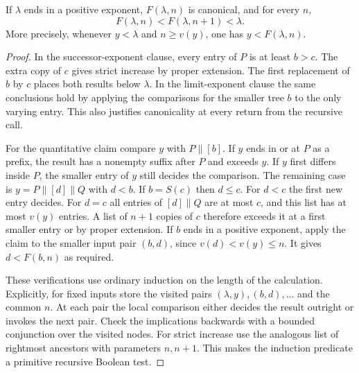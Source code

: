 \begin{theorem}
\label{thm:fsquant}
If $\lambda$ ends in a positive exponent, $F(\lambda,n)$ is canonical,
and for every $n$,
\[
 F(\lambda,n)<F(\lambda,n+1)<\lambda.
\]
More precisely, whenever $y<\lambda$ and $n\ge v(y)$, one has
$y<F(\lambda,n)$.
\end{theorem}
\begin{proof}
In the successor-exponent clause, every entry of $P$ is at least $b>c$.
The extra copy of $c$ gives strict increase by proper extension. The
first replacement of $b$ by $c$ places both results below $\lambda$.
In the limit-exponent clause the same conclusions hold by applying the
comparisons for the smaller tree $b$ to the only varying entry. This
also justifies canonicality at every return from the recursive call.

For the quantitative claim compare $y$ with $P\mathbin{\|}[b]$. If
$y$ ends in or at $P$ as a prefix, the result has a nonempty suffix
after $P$ and exceeds $y$. If $y$ first differs inside $P$, the
smaller entry of $y$ still decides the comparison. The remaining case is
$y=P\mathbin{\|}[d]\mathbin{\|}Q$ with $d<b$. If $b=S(c)$ then
$d\le c$. For $d<c$ the first new entry decides. For $d=c$ all
entries of $[d]\mathbin{\|}Q$ are at most $c$, and this list has
at most $v(y)$ entries. A list of $n+1$ copies of $c$ therefore
exceeds it at a first smaller entry or by proper extension. If $b$ ends
in a positive exponent, apply the claim to the smaller input pair
$(b,d)$, since $v(d)<v(y)\le n$. It gives $d<F(b,n)$ as required.

These verifications use ordinary induction on the length of the
calculation. Explicitly, for fixed inputs store the visited pairs
$(\lambda,y),(b,d),\ldots$ and the common $n$. At each pair the local
comparison either decides the result outright or invokes the next pair.
Check the implications backwards with a bounded conjunction over the
visited nodes. For strict increase use the analogous list of rightmost
ancestors with parameters $n,n+1$. This makes the induction predicate
a primitive recursive Boolean test.
\end{proof}

